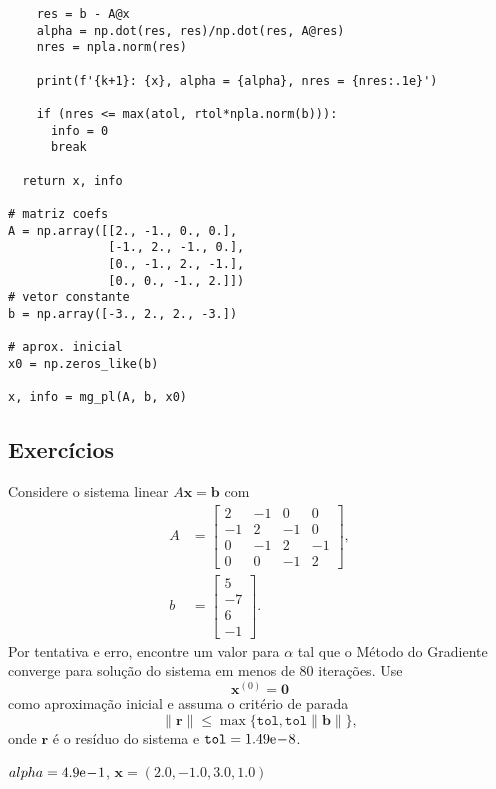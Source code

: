 \begin{ex}
\begin{lstlisting}
    res = b - A@x
    alpha = np.dot(res, res)/np.dot(res, A@res)
    nres = npla.norm(res)

    print(f'{k+1}: {x}, alpha = {alpha}, nres = {nres:.1e}')

    if (nres <= max(atol, rtol*npla.norm(b))):
      info = 0
      break

  return x, info
            
# matriz coefs
A = np.array([[2., -1., 0., 0.],
              [-1., 2., -1., 0.],
              [0., -1., 2., -1.],
              [0., 0., -1., 2.]])
# vetor constante
b = np.array([-3., 2., 2., -3.])

# aprox. inicial
x0 = np.zeros_like(b)

x, info = mg_pl(A, b, x0)
\end{lstlisting}

\end{ex}

\subsection{Exercícios}

\begin{exer}\label{cap_sislin_sec_metg:exer:mg0}
  Considere o sistema linear $A\pmb{x} = \pmb{b}$ com
  \begin{align}
    A &=
    \begin{bmatrix}
      2 & -1 & 0 & 0\\
      -1 & 2 & -1 & 0\\
      0 & -1 & 2 & -1 \\
      0 & 0 & -1 & 2
    \end{bmatrix},\\
    b &=
    \begin{bmatrix}
      5\\
      -7\\
      6\\
      -1
    \end{bmatrix}.
  \end{align}
  Por tentativa e erro, encontre um valor para $\alpha$ tal que o Método do Gradiente converge para solução do sistema em menos de $80$ iterações. Use
  \begin{equation}
    \pmb{x}^{(0)} = \pmb{0}
  \end{equation}
  como aproximação inicial e assuma o critério de parada
  \begin{equation}
    \|\pmb{r}\| \leq \max\{\texttt{tol}, \texttt{tol}\|\pmb{b}\|\},
  \end{equation}
  onde $\pmb{r}$ é o resíduo do sistema e $\texttt{tol} = 1.49\mathrm{e}\!-\!8$.
\end{exer}
\begin{resp}
  $alpha = 4.9\mathrm{e}\!-\!1$, $\pmb{x} = \left(2.0, -1.0, 3.0, 1.0\right)$
\end{resp}

